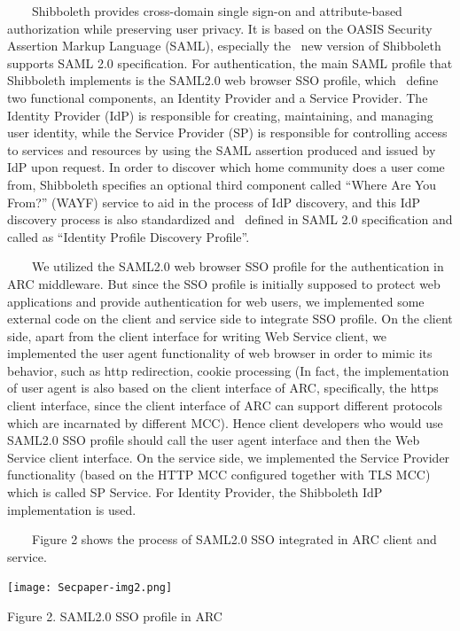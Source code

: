 \documentclass{article}
\begin{document}
\ \ \ \ Shibboleth provides cross-domain single sign-on and
attribute-based authorization while preserving user privacy. It is
based on the OASIS Security Assertion Markup Language (SAML),
especially the \ new version of Shibboleth supports SAML 2.0
specification. For authentication, the main SAML profile that
Shibboleth implements is the SAML2.0 web browser SSO profile, which
\ define two functional components, an Identity Provider and a Service
Provider. The Identity Provider (IdP) is responsible for creating,
maintaining, and managing user identity, while the Service Provider
(SP) is responsible for controlling access to services and resources by
using the SAML assertion produced and issued by IdP upon request. In
order to discover which home community does a user come from,
Shibboleth specifies an optional third component called
{\textquotedblleft}Where Are You From?{\textquotedblright} (WAYF)
service to aid in the process of IdP discovery, and this IdP discovery
process is also standardized and \ defined in SAML 2.0 specification
and called as {\textquotedblleft}Identity Profile Discovery
Profile{\textquotedblright}.

\ \ \ \ We utilized the SAML2.0 web browser SSO profile for the
authentication in ARC middleware. But since the SSO profile is
initially supposed to protect web applications and provide
authentication for web users, we implemented some external code on the
client and service side to integrate SSO profile. On the client side,
apart from the client interface for writing Web Service client, we
implemented the user agent functionality of web browser in order to
mimic its behavior, such as http redirection, cookie processing (In
fact, the implementation of user agent is also based on the client
interface of ARC, specifically, the https client interface, since the
client interface of ARC can support different protocols which are
incarnated by different MCC). Hence client developers who would use
SAML2.0 SSO profile should call the user agent interface and then the
Web Service client interface. On the service side, we implemented the
Service Provider functionality (based on the HTTP MCC configured
together with TLS MCC) which is called SP Service. For Identity
Provider, the Shibboleth IdP implementation is used.

\ \ \ \ Figure 2 shows the process of SAML2.0 SSO integrated in ARC
client and service.


\bigskip



\begin{center}
\texttt{[image: Secpaper-img2.png]}
\end{center}
{\centering
Figure 2. SAML2.0 SSO profile in ARC
\par}
\end{document}
